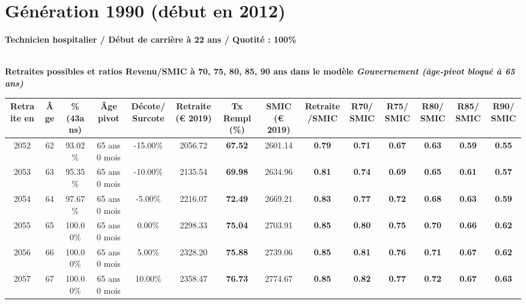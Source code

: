 \newpage 
 
\section{Génération 1990 (début en 2012)\label{TechHosp_100_1990_22_0}} 
 
{\bf \noindent Technicien hospitalier / Début de carrière à 22 ans / Quotité : 100\%}  ~ 

 ~\\{\bf \noindent Retraites possibles et ratios Revenu/SMIC à 70, 75, 80, 85, 90 ans dans le modèle \emph{Gouvernement (âge-pivot bloqué à 65 ans)}}  
 
\begin{adjustbox}{max width=\textwidth} 
\begin{tabular}[htb]{|c|c||c|c|c||c|c||c|c||c|c|c|c|c|} 
\hline 
 Retraite en &  Âge &  \%(43ans) &  Âge pivot &  Décote/Surcote &  Retraite (\euro{} 2019) &  Tx Rempl(\%) &  SMIC (\euro{} 2019) &  Retraite/SMIC &  R70/SMIC &  R75/SMIC &  R80/SMIC &  R85/SMIC &  R90/SMIC \\ 
\hline \hline 
 2052 &  62 &  93.02\% &  65 ans 0 mois &  -15.00\% &  2056.72 &  {\bf 67.52} &  2601.14 &  {\bf {\color{red} 0.79}} &  {\bf {\color{red} 0.71}} &  {\bf {\color{red} 0.67}} &  {\bf {\color{red} 0.63}} &  {\bf {\color{red} 0.59}} &  {\bf {\color{red} 0.55}} \\ 
\hline 
 2053 &  63 &  95.35\% &  65 ans 0 mois &  -10.00\% &  2135.54 &  {\bf 69.98} &  2634.96 &  {\bf {\color{red} 0.81}} &  {\bf {\color{red} 0.74}} &  {\bf {\color{red} 0.69}} &  {\bf {\color{red} 0.65}} &  {\bf {\color{red} 0.61}} &  {\bf {\color{red} 0.57}} \\ 
\hline 
 2054 &  64 &  97.67\% &  65 ans 0 mois &  -5.00\% &  2216.07 &  {\bf 72.49} &  2669.21 &  {\bf {\color{red} 0.83}} &  {\bf {\color{red} 0.77}} &  {\bf {\color{red} 0.72}} &  {\bf {\color{red} 0.68}} &  {\bf {\color{red} 0.63}} &  {\bf {\color{red} 0.59}} \\ 
\hline 
 2055 &  65 &  100.00\% &  65 ans 0 mois &  0.00\% &  2298.33 &  {\bf 75.04} &  2703.91 &  {\bf {\color{red} 0.85}} &  {\bf {\color{red} 0.80}} &  {\bf {\color{red} 0.75}} &  {\bf {\color{red} 0.70}} &  {\bf {\color{red} 0.66}} &  {\bf {\color{red} 0.62}} \\ 
\hline 
 2056 &  66 &  100.00\% &  65 ans 0 mois &  5.00\% &  2328.20 &  {\bf 75.88} &  2739.06 &  {\bf {\color{red} 0.85}} &  {\bf {\color{red} 0.81}} &  {\bf {\color{red} 0.76}} &  {\bf {\color{red} 0.71}} &  {\bf {\color{red} 0.67}} &  {\bf {\color{red} 0.62}} \\ 
\hline 
 2057 &  67 &  100.00\% &  65 ans 0 mois &  10.00\% &  2358.47 &  {\bf 76.73} &  2774.67 &  {\bf {\color{red} 0.85}} &  {\bf {\color{red} 0.82}} &  {\bf {\color{red} 0.77}} &  {\bf {\color{red} 0.72}} &  {\bf {\color{red} 0.67}} &  {\bf {\color{red} 0.63}} \\ 
\hline 
\hline 
\end{tabular} 
\end{adjustbox} 
 

